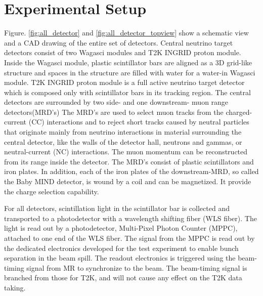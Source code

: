 \section{Experimental Setup}
Figure. \ref{fig:all_detector} and \ref{fig:all_detector_topview} show a schematic view and a CAD drawing of the entire set of detectors.
Central neutrino target detectors consist of two Wagasci modules and T2K INGRID proton module. 
Inside the Wagasci module, plastic scintillator bars are aligned as a 3D grid-like structure
and spaces in the structure are filled with water for a water-in Wagasci module.
T2K INGRID proton module is a full active neutrino target detector which is composed only with scintillator bars in its tracking region. 
The central detectors are surrounded by two side- and one downstream- muon range detectors(MRD's)
The MRD's are used to select muon tracks from the charged-current (CC) interactions 
and to reject short tracks caused by neutral particles 
that originate mainly from neutrino interactions in material surrounding the central detector, like the walls of the detector hall,
neutrons and gammas, or neutral-current (NC) interactions.
The muon momentum can be reconstructed from its range inside the detector.
The MRD's consist of plastic scintillators and iron plates.
In addition, each of the iron plates of the downstream-MRD, so called the Baby MIND detector, is wound by a coil and
can be magnetized. It provide the charge selection capability.


For all detectors, scintillation light in the scintillator bar is collected and transported to a photodetector with a wavelength shifting fiber (WLS fiber).
The light is read out by a photodetector, Multi-Pixel Photon Counter (MPPC), attached to one end of the WLS fiber.
The signal from the MPPC is read out by the dedicated electronics developed for the test experiment
to enable bunch separation in the beam spill.
The readout electronics is triggered using the beam-timing signal from MR to synchronize to the beam.
The beam-timing signal is branched from those for T2K, and will not cause any effect on the T2K data taking.

